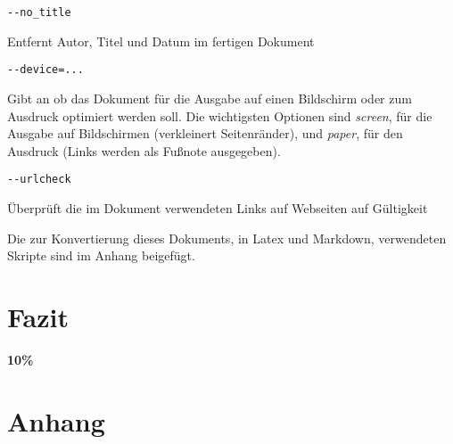 \documentclass[%
oneside,                 %
final,                   %
chapterprefix=true,      %
open=right,              %
10pt]{book}
\begin{document}
\begin{verbatim}
--no_title
\end{verbatim}

Entfernt Autor, Titel und Datum im fertigen Dokument

\begin{verbatim}
--device=...
\end{verbatim}

Gibt an ob das Dokument für die Ausgabe auf einen Bildschirm oder zum Ausdruck optimiert werden soll. Die wichtigsten Optionen sind \emph{screen}, für die Ausgabe auf Bildschirmen (verkleinert Seitenränder), und \emph{paper}, für den Ausdruck (Links werden als Fußnote ausgegeben).

\begin{verbatim}
--urlcheck
\end{verbatim}

Überprüft die im Dokument verwendeten Links auf Webseiten auf Gültigkeit

Die zur Konvertierung dieses Dokuments, in Latex und Markdown, verwendeten Skripte sind im Anhang beigefügt.
\chapter{Fazit}
\textbf{10\%}
\chapter{Anhang}
\end{document}
